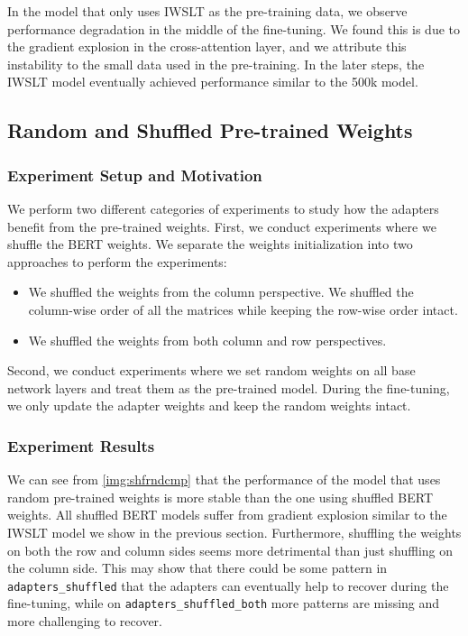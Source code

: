 In the model that only uses IWSLT as the pre-training data, we observe performance degradation in the middle of the fine-tuning. We found this is due to the gradient explosion in the cross-attention layer, and we attribute this instability to the small data used in the pre-training. In the later steps, the IWSLT model eventually achieved performance similar to the 500k model.

\subsection{Random and Shuffled Pre-trained Weights}
\label{ssec:randshuff}
\subsubsection{Experiment Setup and Motivation}
We perform two different categories of experiments to study how the adapters benefit from the pre-trained weights.
First, we conduct experiments where we shuffle the BERT weights. We separate the weights initialization into two approaches to perform the experiments:
\begin{itemize}
    \item We shuffled the weights from the column perspective. We shuffled the column-wise order of all the matrices while keeping the row-wise order intact.
    \item We shuffled the weights from both column and row perspectives.
\end{itemize}

Second, we conduct experiments where we set random weights on all base network layers and treat them as the pre-trained model. During the fine-tuning, we only update the adapter weights and keep the random weights intact.

\subsubsection{Experiment Results}
We can see from \cref{img:shfrndcmp} that the performance of the model that uses random pre-trained weights is more stable than the one using shuffled BERT weights. All shuffled BERT models suffer from gradient explosion similar to the IWSLT model we show in the previous section. Furthermore, shuffling the weights on both the row and column sides seems more detrimental than just shuffling on the column side. This may show that there could be some pattern in \texttt{adapters\_shuffled} that the adapters can eventually help to recover during the fine-tuning, while on \texttt{adapters\_shuffled\_both} more patterns are missing and more challenging to recover.

